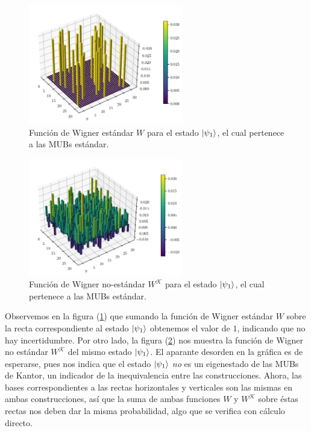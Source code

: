 \documentclass[a4paper]{report}
\begin{document}
  \begin{figure}[ht]
    \centering
    \includegraphics[width=0.6\textwidth]{
    imgs/wigner-standard-2-5-s1.png}
    \caption{Función de Wigner estándar $W$ para el estado
    $\ket{\psi_1}$, el cual pertenece a las MUBs estándar.}
    \label{fig:wigner-standard-2-5-s1}
  \end{figure}
  \begin{figure}[ht]
    \centering
    \includegraphics[width=0.6\textwidth]{
    imgs/wigner-kantor-2-5-s1.png}
    \caption{Función de Wigner no-estándar $W^{\mathcal K}$
    para el estado $\ket{\psi_1}$, el cual pertenece a las
    MUBs estándar.}
    \label{fig:wigner-kantor-2-5-s1}
  \end{figure}
  Observemos en la figura (\ref{fig:wigner-standard-2-5-s1})
  que sumando la función de Wigner estándar $W$ sobre la
  recta correspondiente al estado $\ket{\psi_1}$ obtenemos
  el valor de $1$, indicando que no hay incertidumbre. Por
  otro lado, la figura (\ref{fig:wigner-kantor-2-5-s1}) nos
  muestra la función de Wigner no estándar $W^{\mathcal K}$
  del mismo estado $\ket{\psi_1}$. El aparante desorden en
  la gráfica es de esperarse, pues nos indica que el estado
  $\ket{\psi_1}$ \textit{no} es un eigenestado de las
  MUBs de Kantor, un indicador de la inequivalencia entre
  las construcciones. Ahora, las bases correspondientes a
  las rectas horizontales y verticales son las mismas en
  ambas construcciones, así que la suma de ambas funciones
  $W$ y $W^{\mathcal K}$ sobre éstas rectas nos deben dar la
  misma probabilidad, algo que se verifica con cálculo
  directo.
\end{document}
